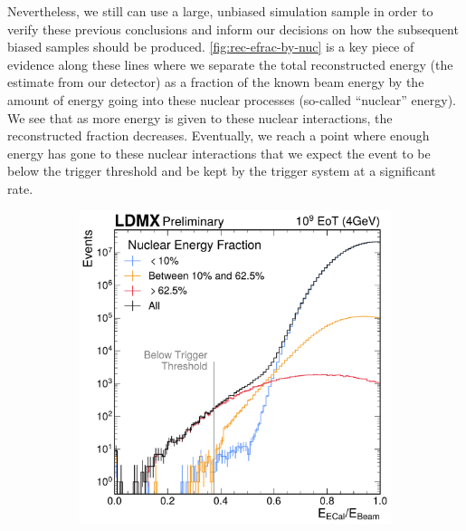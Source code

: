 Nevertheless, we still can use a large, unbiased simulation sample in order to verify
these previous conclusions and inform our decisions on how the subsequent biased samples
should be produced.
\cref{fig:rec-efrac-by-nuc} is a key piece of evidence along these lines
where we separate the total reconstructed energy (the estimate from our detector)
as a fraction of the known beam energy by the amount of energy going into these nuclear
processes (so-called ``nuclear'' energy).
We see that as more energy is given to these nuclear interactions,
the reconstructed fraction decreases.
Eventually, we reach a point where enough energy has gone to these nuclear interactions
that we expect the event to be below the trigger threshold and be kept by the trigger
system at a significant rate.

\begin{figure}
  \centering
  \begin{subfigure}{0.48\textwidth}
    \includegraphics[width=\textwidth]{figures/ldmx/simulation/4gev-ecal-by-nuc.pdf}
  \end{subfigure}
  ~
  \begin{subfigure}{0.48\textwidth}

\end{subfigure}
\end{figure}
